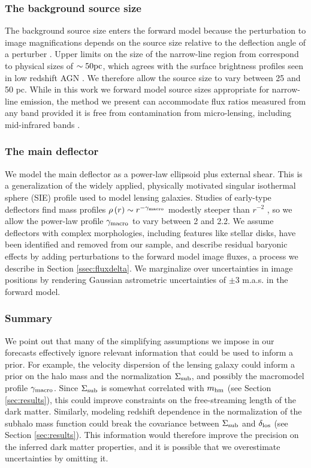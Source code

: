 \subsubsection{The background source size}
The background source size enters the forward model because the perturbation to image magnifications depends on the source size relative to the deflection angle of a perturber \citep{DoblerKeeton02}. Upper limits on the size of the narrow-line region from \citep{Nierenberg++17} correspond to physical sizes of $\sim 50 \rm{pc}$, which agrees with the surface brightness profiles seen in low redshift AGN \citep{MullerSanchez++11}. We therefore allow the source size to vary between 25 and 50 pc. While in this work we forward model source sizes appropriate for narrow-line emission, the method we present can accommodate flux ratios measured from any band provided it is free from contamination from micro-lensing, including mid-infrared bands \citep{Minezaki++09,MacLeod++13}. 

\subsubsection{The main deflector}
We model the main deflector as a power-law ellipsoid plus external shear. This is a generalization of the widely applied, physically motivated \citep[e.g.][]{Treu++06} singular isothermal sphere (SIE) profile used to model lensing galaxies. Studies of early-type deflectors find mass profiles $\rho\left(r\right) \sim r^{-\gamma_{\rm{macro}}}$ modestly steeper than $r ^{-2}$  \citep{Treu++09,Auger++10,Shankar++17}, so we allow the power-law profile $\gamma_{\rm{macro}}$ to vary between 2 and 2.2. We assume deflectors with complex morphologies, including features like stellar disks, have been identified and removed from our sample, and describe residual baryonic effects by adding perturbations to the forward model image fluxes, a process we describe in Section \ref{ssec:fluxdelta}. We marginalize over uncertainties in image positions by rendering Gaussian astrometric uncertainties of $\pm 3$ m.a.s. in the forward model.  

\subsubsection{Summary}
We point out that many of the simplifying assumptions we impose in our forecasts effectively ignore relevant information that could be used to inform a prior. For example, the velocity dispersion of the lensing galaxy could inform a prior on the halo mass and the normalization $\Sigma_{\rm{sub}}$, and possibly the macromodel profile $\gamma_{\rm{macro}}$. Since $\Sigma_{\rm{sub}}$ is somewhat correlated with ${m_{\rm{hm}}}$ (see Section \ref{sec:results}), this could improve constraints on the free-streaming length of the dark matter. Similarly, modeling redshift dependence in the normalization of the subhalo mass function could break the covariance between $\Sigma_{\rm{sub}}$ and $\delta_{\rm{los}}$ (see Section \ref{sec:results}). This information would therefore improve the precision on the inferred dark matter properties, and it is possible that we overestimate uncertainties by omitting it.    

